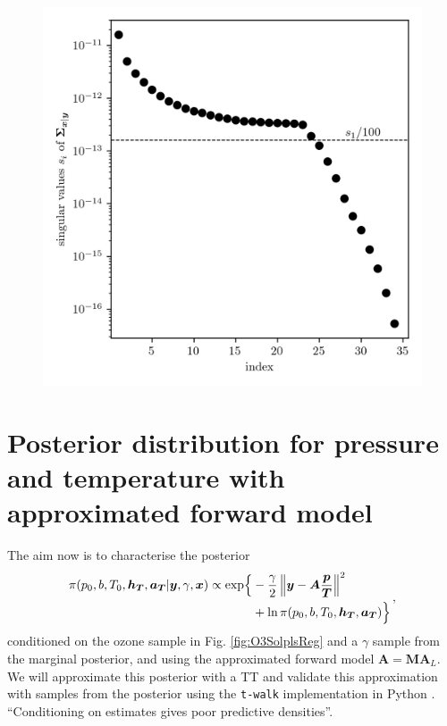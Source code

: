 \begin{figure}[ht!]
	\centering
	\includegraphics{CovSing.png}
	\caption[]{}
	\label{fig:}
\end{figure}

\clearpage

\section{Posterior distribution for pressure and temperature with approximated forward model}
\label{sec:postPT}

The aim now is to characterise the posterior
\begin{align}
	\begin{split}
		\pi(p_0,b,T_0,\bm{h_T},\bm{a_T} | \bm{y}, \gamma, \bm{x}) \propto  \exp\Bigl\{ & -\frac{\gamma}{2} \left\Vert \bm{y}- \bm{A} \frac{\bm{p}}{\bm{T}}  \right\Vert^2 \\ &+ \ln{\pi(p_0,b,T_0,\bm{h_T},\bm{a_T}) \Bigr\}  }
	\end{split} \, ,
	\label{eq:postPT}
\end{align}
conditioned on the ozone sample in Fig. \ref{fig:O3SolplsReg} and a $\gamma$ sample from the marginal posterior, and using the approximated forward model $\bm{A} = \bm{M}\bm{A}_L$.
We will approximate this posterior with a TT and validate this approximation with samples from the posterior using the \texttt{t-walk} \cite{christen2010general} implementation in Python \cite{christentwalkaccess}.
“Conditioning
on estimates gives poor predictive densities”.
\cite{tan2016LecNot}


